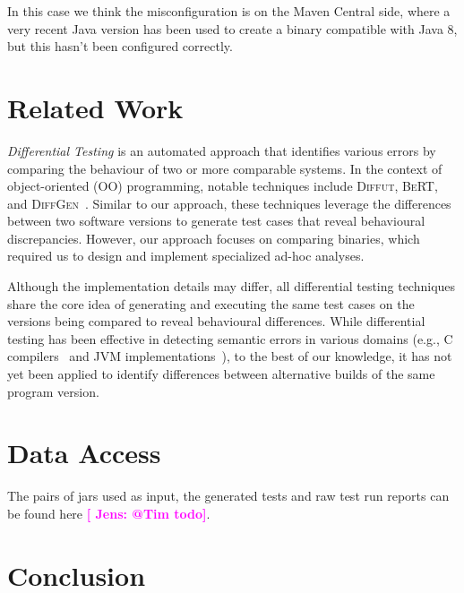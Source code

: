 \documentclass[conference]{IEEEtran}
\newcommand{\jens}[1]{\textbf{\textcolor{magenta}{[ \ding{46}Jens: #1]}}}
\begin{document}
In this case we think the misconfiguration is on the Maven Central side, where a very recent Java version has been used to create a binary compatible with Java 8, but this hasn't been configured correctly.






\section{Related Work}
\label{sec:relatedwork}

\emph{Differential Testing}\cite{difftesting} is an automated approach that identifies various errors by comparing the behaviour of two or more comparable systems\cite{xie2007towards,jin10:automated,diffgen}. In the context of object-oriented (OO) programming, notable techniques include \textsc{Diffut}\cite{xie2007towards}, \textsc{BeRT}\cite{jin10:automated}, and \textsc{DiffGen}~\cite{diffgen}. Similar to our approach, these techniques leverage the differences between two software versions to generate test cases that reveal behavioural discrepancies. However, our approach focuses on comparing binaries, which required us to design and implement specialized ad-hoc analyses.

Although the implementation details may differ, all differential testing techniques share the core idea of generating and executing the same test cases on the versions being compared to reveal behavioural differences. %
While differential testing has been effective in detecting semantic errors in various domains (e.g., C compilers~\cite{Yang:compiler:pldi:2011} and JVM implementations~\cite{Chen:jvmdiff:pldi:2016}), to the best of our knowledge, it has not yet been applied to identify differences between alternative builds of the same program version.


\section{Data Access}
\label{sec:dataaccess}

The pairs of jars used as input, the generated tests and raw test run reports can be found here \jens{@Tim todo}. 


\section{Conclusion}
\label{sec:conclusion}
\end{document}
